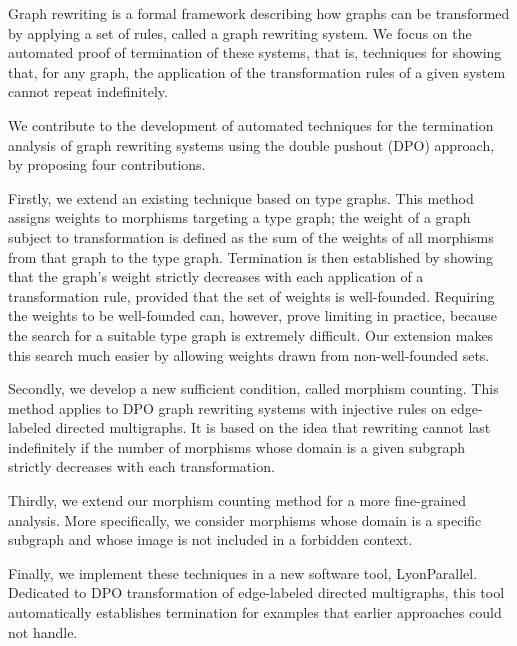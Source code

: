 Graph rewriting is a formal framework describing how graphs can be transformed by applying a set of rules, called a graph rewriting system. We focus on the automated proof of termination of these systems, that is, techniques for showing that, for any graph, the application of the transformation rules of a given system cannot repeat indefinitely.

We contribute to the development of automated techniques for the termination analysis of graph rewriting systems using the double pushout (DPO) approach, by proposing four contributions.

Firstly, we extend an existing technique based on type graphs. This method assigns weights to morphisms targeting a type graph; the weight of a graph subject to transformation is defined as the sum of the weights of all morphisms from that graph to the type graph. Termination is then established by showing that the graph's weight strictly decreases with each application of a transformation rule, provided that the set of weights is well-founded. Requiring the weights to be well-founded can, however, prove limiting in practice, because the search for a suitable type graph is extremely difficult. Our extension makes this search much easier by allowing weights drawn from non-well-founded sets.

Secondly, we develop a new sufficient condition, called morphism counting. This method applies to DPO graph rewriting systems with injective rules on edge-labeled directed multigraphs. It is based on the idea that rewriting cannot last indefinitely if the number of morphisms whose domain is a given subgraph strictly decreases with each transformation.

Thirdly, we extend our morphism counting method for a more fine-grained analysis. More specifically, we consider morphisms whose domain is a specific subgraph and whose image is not included in a forbidden context.

Finally, we implement these techniques in a new software tool, LyonParallel. Dedicated to DPO transformation of edge-labeled directed multigraphs, this tool automatically establishes termination for examples that earlier approaches could not handle.